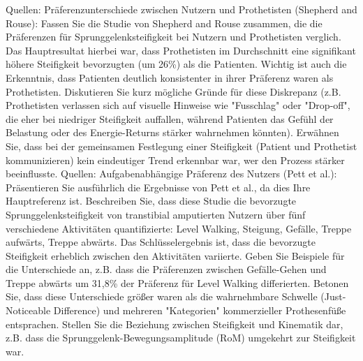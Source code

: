 Quellen:
Präferenzunterschiede zwischen Nutzern und Prothetisten (Shepherd and Rouse): Fassen Sie die Studie von Shepherd and Rouse zusammen, die die Präferenzen für Sprunggelenksteifigkeit bei Nutzern und Prothetisten verglich. Das Hauptresultat hierbei war, dass Prothetisten im Durchschnitt eine signifikant höhere Steifigkeit bevorzugten (um 26\%) als die Patienten. Wichtig ist auch die Erkenntnis, dass Patienten deutlich konsistenter in ihrer Präferenz waren als Prothetisten. Diskutieren Sie kurz mögliche Gründe für diese Diskrepanz (z.B. Prothetisten verlassen sich auf visuelle Hinweise wie "Fusschlag" oder "Drop-off", die eher bei niedriger Steifigkeit auffallen, während Patienten das Gefühl der Belastung oder des Energie-Returns stärker wahrnehmen könnten). Erwähnen Sie, dass bei der gemeinsamen Festlegung einer Steifigkeit (Patient und Prothetist kommunizieren) kein eindeutiger Trend erkennbar war, wer den Prozess stärker beeinflusste.
Quellen:
Aufgabenabhängige Präferenz des Nutzers (Pett et al.): Präsentieren Sie ausführlich die Ergebnisse von Pett et al., da dies Ihre Hauptreferenz ist. Beschreiben Sie, dass diese Studie die bevorzugte Sprunggelenksteifigkeit von transtibial amputierten Nutzern über fünf verschiedene Aktivitäten quantifizierte: Level Walking, Steigung, Gefälle, Treppe aufwärts, Treppe abwärts. Das Schlüsselergebnis ist, dass die bevorzugte Steifigkeit erheblich zwischen den Aktivitäten variierte. Geben Sie Beispiele für die Unterschiede an, z.B. dass die Präferenzen zwischen Gefälle-Gehen und Treppe abwärts um 31,8\% der Präferenz für Level Walking differierten. Betonen Sie, dass diese Unterschiede größer waren als die wahrnehmbare Schwelle (Just-Noticeable Difference) und mehreren "Kategorien" kommerzieller Prothesenfüße entsprachen. Stellen Sie die Beziehung zwischen Steifigkeit und Kinematik dar, z.B. dass die Sprunggelenk-Bewegungsamplitude (RoM) umgekehrt zur Steifigkeit war.